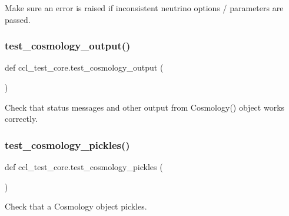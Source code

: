 \begin{DoxyVerb}Make sure an error is raised if inconsistent neutrino options /
parameters are passed.\end{DoxyVerb}
 \mbox{\label{namespaceccl__test__core_a7086ffc367c4c602cd12e67b76209a44}} 
\subsubsection{\texorpdfstring{test\+\_\+cosmology\+\_\+output()}{test\_cosmology\_output()}}
{\footnotesize\ttfamily def ccl\+\_\+test\+\_\+core.\+test\+\_\+cosmology\+\_\+output (\begin{DoxyParamCaption}{ }\end{DoxyParamCaption})}

\begin{DoxyVerb}Check that status messages and other output from Cosmology() object works
correctly.
\end{DoxyVerb}
 \mbox{\label{namespaceccl__test__core_a6eb4932e1d1d3b5ba670e92cb7380254}} 
\subsubsection{\texorpdfstring{test\+\_\+cosmology\+\_\+pickles()}{test\_cosmology\_pickles()}}
{\footnotesize\ttfamily def ccl\+\_\+test\+\_\+core.\+test\+\_\+cosmology\+\_\+pickles (\begin{DoxyParamCaption}{ }\end{DoxyParamCaption})}

\begin{DoxyVerb}Check that a Cosmology object pickles.\end{DoxyVerb}
 \mbox{\label{namespaceccl__test__core_a378920c66829abd38df0532cdbc13f22}} 
